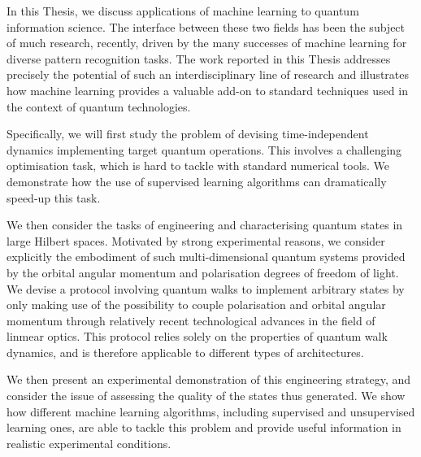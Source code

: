 In this Thesis, we discuss applications of machine learning to quantum information science.
The interface between these two fields has been the subject of much research, recently, driven by the many successes of machine learning for diverse pattern recognition tasks. The work reported in this Thesis addresses precisely the potential of such an interdisciplinary line of research and illustrates how machine learning provides a valuable add-on to standard techniques used in the context of quantum technologies.

Specifically, we will first study the problem of devising time-independent dynamics implementing target quantum operations.
This involves a challenging optimisation task, which is hard to tackle with standard numerical tools.
We demonstrate how the use of supervised learning algorithms can dramatically speed-up this task.

We then consider the tasks of engineering and characterising quantum states in large Hilbert spaces. Motivated by strong experimental reasons, we consider explicitly the embodiment of such multi-dimensional quantum systems provided by the orbital angular momentum and polarisation degrees of freedom of light.
We devise a protocol involving quantum walks to implement arbitrary states by only making use of the possibility to couple polarisation and orbital angular momentum through relatively recent technological advances in the field of linmear optics.
This protocol relies solely on the properties of quantum walk dynamics, and is therefore applicable to different types of architectures.

We then present an experimental demonstration of this engineering strategy, and consider the issue of assessing the quality of the states thus generated.
We show how different machine learning algorithms, including supervised and unsupervised learning ones, are able to tackle this problem and provide useful information in realistic experimental conditions.



\clearpage


\tableofcontents



\clearpage

